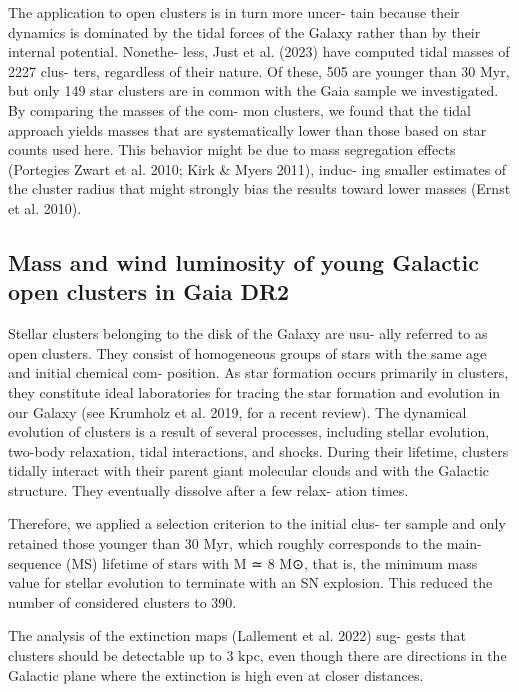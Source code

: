 \documentclass[../Main.tex]{subfiles}
\begin{document}
{The application to open clusters is in turn more uncer-
tain because their dynamics is dominated by the tidal forces
of the Galaxy rather than by their internal potential. Nonethe-
less, Just et al. (2023) have computed tidal masses of 2227 clus-
ters, regardless of their nature. Of these, 505 are younger than
30 Myr, but only 149 star clusters are in common with the Gaia
sample we investigated. By comparing the masses of the com-
mon clusters, we found that the tidal approach yields masses
that are systematically lower than those based on star counts
used here. This behavior might be due to mass segregation
eﬀects (Portegies Zwart et al. 2010; Kirk & Myers 2011), induc-
ing smaller estimates of the cluster radius that might strongly
bias the results toward lower masses (Ernst et al. 2010).



\subsection{Mass and wind luminosity of young Galactic open clusters in Gaia DR2}


Stellar clusters belonging to the disk of the Galaxy are usu-
ally referred to as open clusters. They consist of homogeneous
groups of stars with the same age and initial chemical com-
position. As star formation occurs primarily in clusters, they
constitute ideal laboratories for tracing the star formation and
evolution in our Galaxy (see Krumholz et al. 2019, for a recent
review). The dynamical evolution of clusters is a result of several
processes, including stellar evolution, two-body relaxation, tidal
interactions, and shocks. During their lifetime, clusters tidally
interact with their parent giant molecular clouds and with the
Galactic structure. They eventually dissolve after a few relax-
ation times.

Therefore, we applied a selection criterion to the initial clus-
ter sample and only retained those younger than 30 Myr, which
roughly corresponds to the main-sequence (MS) lifetime of stars
with M ≃ 8 M⊙, that is, the minimum mass value for stellar
evolution to terminate with an SN explosion. This reduced the
number of considered clusters to 390.

The analysis of the extinction maps (Lallement et al. 2022) sug-
gests that clusters should be detectable up to 3 kpc, even though
there are directions in the Galactic plane where the extinction is
high even at closer distances.

}
\end{document}
